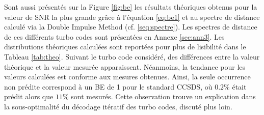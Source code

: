 Sont aussi présentés sur la Figure \ref{fig:be} les résultats théoriques obtenus pour la valeur de SNR la plus grande
grâce à l'équation \ref{eq:be1} et au spectre de distance calculé via la Double Impulse Method (cf. \ref{seq:spectre}). 
Les spectres de distance de ces différents turbo codes sont présentées en Annexe \ref{sec:ann3}. Les distributions théoriques
calculées sont reportées pour plus de lisibilité dans le Tableau \ref{tab:theo}. Suivant le turbo code considéré,
des différences entre la valeur théorique et la valeur mesurée apparaissent. Néanmoins, la tendance pour les valeurs
calculées est conforme
aux mesures obtenues. Ainsi, la seule occurrence non prédite correspond à un BE de 1 pour le standard CCSDS, où $0.2\%$ 
était prédit alors que $11\%$ sont mesurés. Cette observation trouve un explication dans la sous-optimalité du décodage 
itératif des turbo codes, discuté plus loin.

\begin{table}[]
\centering
\caption{Distribution théorique des erreurs dans le plancher d'erreur selon l'équation \ref{eq:be1} pour différents turbo 
codes standardisés}
\label{tab:theo}
\end{table}

